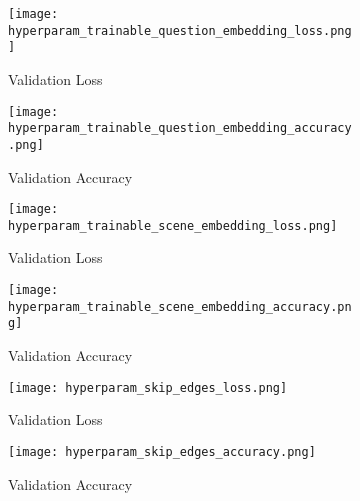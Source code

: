 \begin{figure}
    \centering
    \begin{subfigure}[l]{0.5\textwidth}
        \texttt{[image: hyperparam\_trainable\_question\_embedding\_loss.png]}
        \label{fig:hyperparam_trainable_question_embedding_loss}
        \caption{Validation Loss}
    \end{subfigure}
    \begin{subfigure}[r]{0.49\textwidth}
        \texttt{[image: hyperparam\_trainable\_question\_embedding\_accuracy.png]}
        \label{fig:hyperparam_trainable_question_embedding_accuracy}
        \caption{Validation Accuracy}
    \end{subfigure}
    \caption{}
    \label{fig:hyperparam_trainable_question_embedding_loss_and_accuracy}
\end{figure}
 
\begin{figure}
    \centering
    \begin{subfigure}[l]{0.5\textwidth}
        \texttt{[image: hyperparam\_trainable\_scene\_embedding\_loss.png]}
        \label{fig:hyperparam_trainable_scene_embedding_loss}
        \caption{Validation Loss}
    \end{subfigure}
    \begin{subfigure}[r]{0.49\textwidth}
        \texttt{[image: hyperparam\_trainable\_scene\_embedding\_accuracy.png]}
        \label{fig:hyperparam_trainable_scene_embedding_accuracy}
        \caption{Validation Accuracy}
    \end{subfigure}
    \caption{}
    \label{fig:hyperparam_trainable_scene_embedding_loss_and_accuracy}
\end{figure}

\begin{figure}
    \centering
    \begin{subfigure}[l]{0.5\textwidth}
        \texttt{[image: hyperparam\_skip\_edges\_loss.png]}
        \label{fig:hyperparam_skip_edges_loss}
        \caption{Validation Loss}
    \end{subfigure}
    \begin{subfigure}[r]{0.49\textwidth}
        \texttt{[image: hyperparam\_skip\_edges\_accuracy.png]}
        \label{fig:hyperparam_skip_edges_accuracy}
        \caption{Validation Accuracy}
    \end{subfigure}
    \caption{}
    \label{fig:hyperparam_skip_edges_loss_and_accuracy}
\end{figure}
